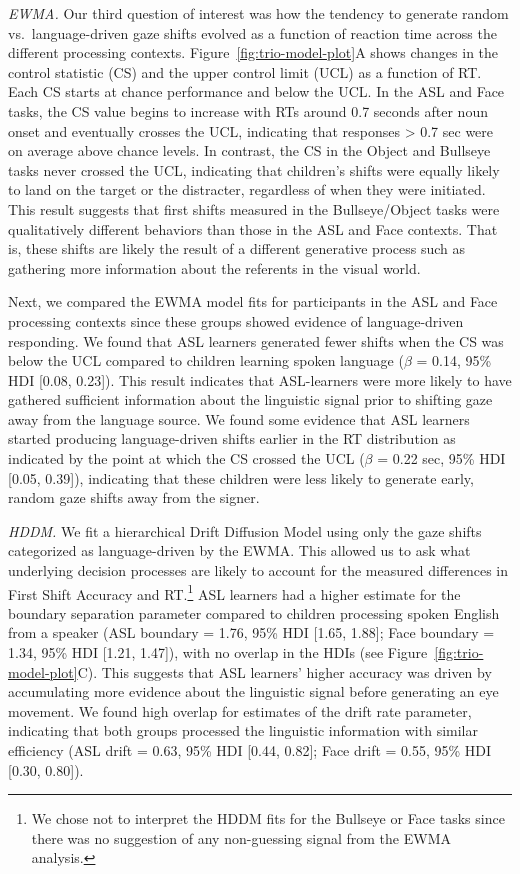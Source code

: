 \documentclass[,man,floatsintext]{apa6}
\let\rmarkdownfootnote\footnote%
\def\footnote{\protect\rmarkdownfootnote}
\begin{document}
\emph{EWMA.} Our third question of interest was how the tendency to
generate random vs.~language-driven gaze shifts evolved as a function of
reaction time across the different processing contexts.
Figure~\ref{fig:trio-model-plot}A shows changes in the control statistic
(CS) and the upper control limit (UCL) as a function of RT. Each CS
starts at chance performance and below the UCL. In the ASL and Face
tasks, the CS value begins to increase with RTs around 0.7 seconds after
noun onset and eventually crosses the UCL, indicating that responses
\textgreater{} 0.7 sec were on average above chance levels. In contrast,
the CS in the Object and Bullseye tasks never crossed the UCL,
indicating that children's shifts were equally likely to land on the
target or the distracter, regardless of when they were initiated. This
result suggests that first shifts measured in the Bullseye/Object tasks
were qualitatively different behaviors than those in the ASL and Face
contexts. That is, these shifts are likely the result of a different
generative process such as gathering more information about the
referents in the visual world.

Next, we compared the EWMA model fits for participants in the ASL and
Face processing contexts since these groups showed evidence of
language-driven responding. We found that ASL learners generated fewer
shifts when the CS was below the UCL compared to children learning
spoken language (\(\beta\) = 0.14, 95\% HDI {[}0.08, 0.23{]}). This
result indicates that ASL-learners were more likely to have gathered
sufficient information about the linguistic signal prior to shifting
gaze away from the language source. We found some evidence that ASL
learners started producing language-driven shifts earlier in the RT
distribution as indicated by the point at which the CS crossed the UCL
(\(\beta\) = 0.22 sec, 95\% HDI {[}0.05, 0.39{]}), indicating that these
children were less likely to generate early, random gaze shifts away
from the signer.

\emph{HDDM.} We fit a hierarchical Drift Diffusion Model using only the
gaze shifts categorized as language-driven by the EWMA. This allowed us
to ask what underlying decision processes are likely to account for the
measured differences in First Shift Accuracy and RT.\footnote{We chose
  not to interpret the HDDM fits for the Bullseye or Face tasks since
  there was no suggestion of any non-guessing signal from the EWMA
  analysis.} ASL learners had a higher estimate for the boundary
separation parameter compared to children processing spoken English from
a speaker (ASL boundary = 1.76, 95\% HDI {[}1.65, 1.88{]}; Face boundary
= 1.34, 95\% HDI {[}1.21, 1.47{]}), with no overlap in the HDIs (see
Figure~\ref{fig:trio-model-plot}C). This suggests that ASL learners'
higher accuracy was driven by accumulating more evidence about the
linguistic signal before generating an eye movement. We found high
overlap for estimates of the drift rate parameter, indicating that both
groups processed the linguistic information with similar efficiency (ASL
drift = 0.63, 95\% HDI {[}0.44, 0.82{]}; Face drift = 0.55, 95\% HDI
{[}0.30, 0.80{]}).
\end{document}
